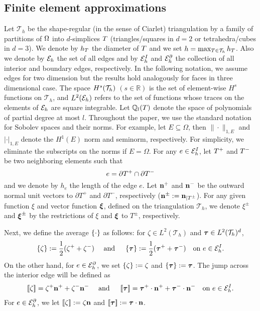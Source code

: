 \documentclass[11pt]{article}
\begin{document}
\subsection{Finite element approximations}
Let $\mathcal{T}_h$ be the shape-regular (in the sense of Ciarlet)  triangulation by a family of partitions of $\Omega$ into $d$-simplices $T$ (triangles/squares in $d=2$ or tetrahedra/cubes in $d=3$). We denote by $h_{T}$ the diameter of $T$ and we set $h=\max_{T \in \mathcal{T}_h} h_{T}$.  
Also we denote by ${{\mathcal E}_h}$ the set of all edges and by ${{\mathcal E}^{I}_h}$ and ${{\mathcal E}^{\partial}_h}$ the collection of all interior and boundary edges, respectively. 
In the following notation, we assume edges for two dimension but the results hold analogously for faces in three dimensional case.
The space $H^{s}(\mathcal{T}_h)$ $(s\in \mathbb{R})$ is the set of element-wise $H^{s}$ functions on $\mathcal{T}_h$, and $L^{2}({{\mathcal E}_h})$ refers to the set of functions whose traces on the elements of ${{\mathcal E}_h}$ are square integrable. Let $\mathbb{Q}_l(T)$ denote the space of polynomials of partial degree at most $l$. 
Throughout the paper, we use the standard notation for Sobolev spaces and their norms. For example, let $E \subseteq \Omega$, then $\|\cdot\|_{1,E}$ and $|\cdot|_{1,E}$ denote the $H^1(E)$ norm and seminorm, respectively. 
For simplicity, we eliminate the subscripts on the norms if $E = \Omega$.
For any $e \in {{\mathcal E}^{I}_h}$, let $T^{+}$ and $T^{-}$ be two neighboring elements such that  
$$
e = \partial T^{+}\cap \partial T^{-}
$$
and we denote by $h_{e}$ the length of the edge $e$. 
Let ${\bf n}^{+}$ and ${\bf n}^{-}$ be the outward normal unit vectors to  $\partial T^+$ and $\partial T^-$, respectively (${\bf n}^{\pm} :={\bf n}_{|T^{\pm}}$). 
For any given function $\xi$ and vector function ${\boldsymbol \xi}$, defined on the triangulation $\mathcal{T}_h$, we denote $\xi^{\pm}$ and ${\boldsymbol \xi}^{\pm}$ by the restrictions of $\xi$ and ${\boldsymbol \xi}$ to $T^\pm$, respectively. 

Next, we define the  average $\left\{ \cdot \right\}$ as follows: for $\zeta \in L^2(\mathcal{T}_h)$ and ${\boldsymbol {\tau}} \in L^2(\mathcal{T}_h)^d$,
\begin{equation}\label{av-w}
\left\{ \zeta \right\} := \frac{1}{2} (\zeta^+ + \zeta^- )
\quad \mbox{ and } \quad 
\left\{ {\boldsymbol {\tau}} \right\} := \frac{1}{2} ({\boldsymbol {\tau}}^+ +   {\boldsymbol {\tau}}^-) \quad \mbox{on } e\in
{{\mathcal E}^{I}_h}.
\end{equation}
On the other hand, for $e \in {{\mathcal E}^{\partial}_h}$, we set $\left\{ \zeta \right\} :=   \zeta$ and $\left\{ {\boldsymbol {\tau}} \right\} :=  {\boldsymbol {\tau}}$. 
The jump across the interior edge will be defined as 
\begin{align*}
\left\lbrack\!\left\lbrack \zeta \right\rbrack\!\right\rbrack = \zeta^+{\bf n}^++\zeta^-{\bf n}^- \quad \mbox{ and } \quad \left\lbrack\!\left\lbrack {\boldsymbol {\tau}} \right\rbrack\!\right\rbrack = {\boldsymbol {\tau}}^+\cdot{\bf n}^+ + {\boldsymbol {\tau}}^-\cdot{\bf n}^- \quad \mbox{on } e\in {{\mathcal E}^{I}_h}. 
\end{align*}
For  $e \in {{\mathcal E}^{\partial}_h}$, we let $\left\lbrack\!\left\lbrack \zeta \right\rbrack\!\right\rbrack :=  \zeta {\bf n}$ and $\left\lbrack\!\left\lbrack {\boldsymbol {\tau}} \right\rbrack\!\right\rbrack :=  {\boldsymbol {\tau}} \cdot {\bf n}$. 
\end{document}
